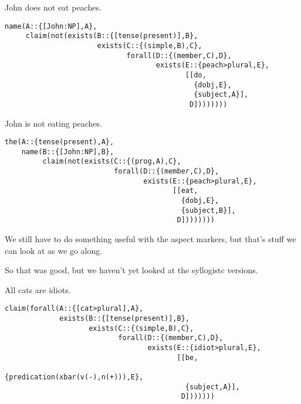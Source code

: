 \documentclass[11pt]{article}
\begin{document}
\begin{examples}
\item 
\begin{examples}
\item
John does not eat peaches.

\begin{Verbatim}[commandchars=\\\{\}]
name(A::{[John:NP],A},
     claim(not(exists(B::{[tense(present)],B},
                      exists(C::{(simple,B),C},
                             forall(D::{(member,C),D},
                                    exists(E::{peach>plural,E},
                                           [[do,
                                             {dobj,E},
                                             {subject,A}],
                                            D])))))))
\end{Verbatim}
\item
John is not eating peaches. 

\begin{Verbatim}[commandchars=\\\{\}]
the(A::{tense(present),A},
    name(B::{[John:NP],B},
         claim(not(exists(C::{(prog,A),C},
                          forall(D::{(member,C),D},
                                 exists(E::{peach>plural,E},
                                        [[eat,
                                          {dobj,E},
                                          {subject,B}],
                                         D])))))))
\end{Verbatim}
\end{examples}
\end{examples}

\noindent
We still have to do something useful with the aspect markers, but
that's stuff we can look at as we go along.

\newpage
So that was good, but we haven't yet looked at the syllogistc
versions.

\begin{examples}
\item
All cats are idiots.

\begin{Verbatim}[commandchars=\\\{\}]
claim(forall(A::{[cat>plural],A},
             exists(B::{[tense(present)],B},
                    exists(C::{(simple,B),C},
                           forall(D::{(member,C),D},
                                  exists(E::{idiot>plural,E},
                                         [[be,
                                           {predication(xbar(v(-),n(+))),E},
                                           {subject,A}],
                                          D]))))))
\end{Verbatim}
\end{examples}
\end{document}
